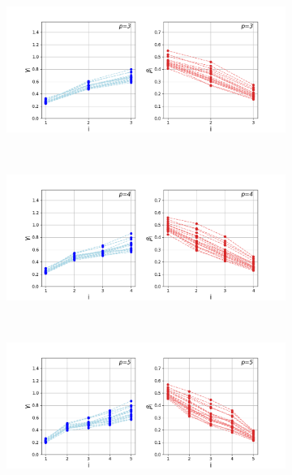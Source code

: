 \newpage
\begin{figure}[H]
	\centering
	\begin{subfigure}[t]{0.7\textwidth}
		\centering
		\includegraphics[width=\textwidth]{figures/interp/patterns/pattern_12-nodal_ER050_p-3.png}
	\end{subfigure}
	\\
	\centering
	\begin{subfigure}[t]{0.7\textwidth}
		\centering
		\includegraphics[width=\textwidth]{figures/interp/patterns/pattern_12-nodal_ER050_p-4.png}
	\end{subfigure}
	\\
	\centering
	\begin{subfigure}[t]{0.7\textwidth}
		\centering
		\includegraphics[width=\textwidth]{figures/interp/patterns/pattern_12-nodal_ER050_p-5.png}

\end{subfigure}
\end{figure}
